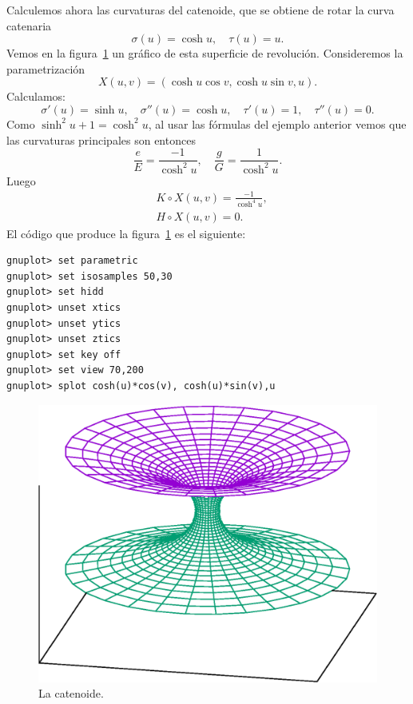 \begin{example}
	\label{exa:catenoide}
	Calculemos ahora las curvaturas del catenoide, que se obtiene de rotar la
	curva catenaria 
	\[
		\sigma(u)=\cosh u,\quad
		\tau(u)=u.
	\]
	Vemos en la figura~\ref{fig:catenoide} un gráfico de esta superficie de revolución.
	Consideremos la parametrización
	\[
		X(u,v)=(\cosh u \cos v ,\cosh u \sin v ,u).
	\]
	Calculamos:
	\[
		\sigma'(u)=\sinh u,\quad
		\sigma''(u)=\cosh u,\quad
		\tau'(u)=1,\quad
		\tau''(u)=0.
	\]
	Como $\sinh^2 u+1=\cosh^2 u$, al usar las fórmulas del ejemplo anterior 
	vemos que las curvaturas principales son entonces
	\[
		\frac{e}{E}=\frac{-1}{\cosh^2 u},\quad
		\frac{g}{G}=\frac{1}{\cosh^2 u}.
	\]
	Luego
	\begin{align*}
		&K\circ X(u,v)=\frac{-1}{\cosh^4 u},\\
		&H\circ X(u,v)=0.
	\end{align*}
	El código que produce la figura~\ref{fig:catenoide} es el siguiente:
\begin{lstlisting}
gnuplot> set parametric
gnuplot> set isosamples 50,30
gnuplot> set hidd
gnuplot> unset xtics
gnuplot> unset ytics
gnuplot> unset ztics
gnuplot> set key off
gnuplot> set view 70,200
gnuplot> splot cosh(u)*cos(v), cosh(u)*sin(v),u
\end{lstlisting}
\begin{figure}
		\centering
    	\includegraphics[scale=0.3]{eps/catenoide}
		\caption{La catenoide.}
		\label{fig:catenoide}
\end{figure}
\end{example}
	
